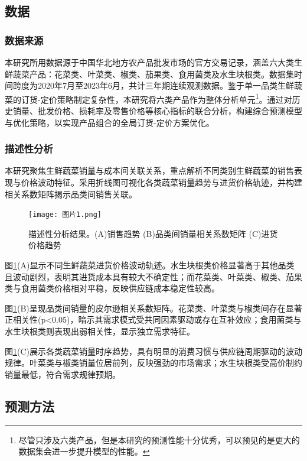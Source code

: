 \documentclass[lang=cn,12pt,a4paper]{elegantpaper}
\begin{document}
\subsection{数据}
\label{subsec:data}

\subsubsection{数据来源}
\label{subsubsec:data_sources}
本研究所用数据源于中国华北地方农产品批发市场的官方交易记录，涵盖六大类生鲜蔬菜产品：花菜类、叶菜类、椒类、茄果类、食用菌类及水生块根类。数据集时间跨度为2020年7月至2023年6月，共计三年期连续观测数据。鉴于单一品类生鲜蔬菜的订货-定价策略制定复杂性，本研究将六类产品作为整体分析单元\footnote{尽管只涉及六类产品，但是本研究的预测性能十分优秀，可以预见的是更大的数据集会进一步提升模型的性能。}。通过对历史销量、批发价格、损耗率及零售价格等核心指标的联合分析，构建综合预测模型与优化策略，以实现产品组合的全局订货-定价方案优化。

\subsubsection{描述性分析}
\label{subsubsec:descriptive_analysis}
本研究聚焦生鲜蔬菜销量与成本间关联关系，重点解析不同类别生鲜蔬菜的销售表现与价格波动特征。采用折线图可视化各类蔬菜销量趋势与进货价格轨迹，并构建相关系数矩阵揭示品类间销售关联。

\begin{figure}[H]
    \centering
    \texttt{[image: 图片1.png]}
    \caption{描述性分析结果。(A)销售趋势 (B)品类间销量相关系数矩阵 (C)进货价格趋势}
    \label{fig:fig1}
\end{figure}

图\ref{fig:fig1}(A)显示不同生鲜蔬菜进货价格波动轨迹。水生块根类价格显著高于其他品类且波动剧烈，表明其进货成本具有较大不确定性；而花菜类、叶菜类、椒类、茄果类与食用菌类价格相对平稳，反映供应链成本稳定性较高。

图\ref{fig:fig1}(B)呈现品类间销量的皮尔逊相关系数矩阵。花菜类、叶菜类与椒类间存在显著正相关性(p<0.05)，暗示其需求模式受共同因素驱动或存在互补效应；食用菌类与水生块根类则表现出弱相关性，显示独立需求特征。

图\ref{fig:fig1}(C)展示各类蔬菜销量时序趋势，具有明显的消费习惯与供应链周期驱动的波动规律。叶菜类与椒类销量位居前列，反映强劲的市场需求；水生块根类受高价制约销量最低，符合需求规律预期。
\subsection{预测方法}
\label{subsec:forecasting_method}
\end{document}
